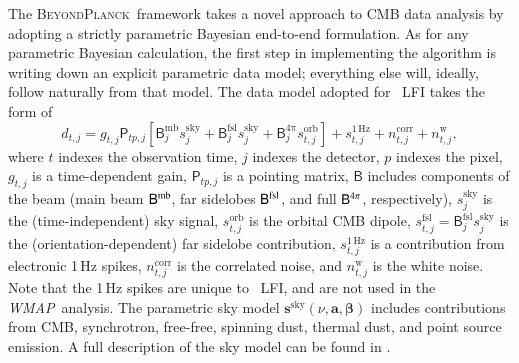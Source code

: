 \documentclass[twocolumn]{aa}
\def\wmap{\emph{WMAP}}
\newcommand{\BP}{\textsc{BeyondPlanck}}
\begin{document}
The \BP\ framework \citep{bp01} takes a novel approach to CMB data analysis by
adopting a strictly parametric Bayesian end-to-end formulation. As for any
parametric Bayesian calculation, the first step in implementing the algorithm
is writing down an explicit parametric data model; everything else will, ideally,
follow naturally from that model. The data model adopted for \Planck\
LFI takes the form of
\begin{equation} d_{t,j}=g_{t,j} \mathsf P_{tp,j}\left[
	\mathsf B_{j}^\mathrm{mb} s_{j}^\mathrm{sky} + \mathsf
	B_{j}^\mathrm{fsl} s_{j}^{\mathrm{sky}} +\mathsf
	B_{j}^\mathrm{4\pi}s_{t,j}^\mathrm{orb} \right]
	+ s_{t,j}^{\mathrm{1\,Hz}}+n_{t,j}^\mathrm{corr}+n_{t,j}^\mathrm w,
	    \label{eq:todmodel}
\end{equation}
where $t$ indexes the observation time, $j$ indexes the
detector, $p$ indexes the pixel, $g_{t,j}$ is a time-dependent gain, $\mathsf P_{tp,j}$ is a pointing
matrix, $\mathsf B$ includes components of the beam (main beam $\mathsf{B}^\mathrm{mb}$, far sidelobes $\mathsf{B}^\mathrm{fsl}$, and full $\mathsf{B}^\mathrm{4\pi}$, respectively), $s_{j}^\mathrm{sky}$ is the (time-independent)
sky signal, $s_{t,j}^\mathrm{orb}$ is the orbital CMB dipole,
${s_{t,j}^\mathrm{fsl}=\mathsf B_j^\mathrm{fsl}s_{j}^\mathrm{sky}}$ is the
(orientation-dependent) far sidelobe contribution,
$s_{t,j}^\mathrm{1\,Hz}$ is a contribution from electronic 1\,Hz spikes, $n_{t,j}^\mathrm{corr}$ is
the correlated noise, and $n_{t,j}^\mathrm w$ is the white noise. Note that the 1\,Hz spikes are unique to \Planck\ LFI, and are not used in the \wmap\ analysis.
The parametric sky model $\boldsymbol s^\mathrm{sky}(\nu,\boldsymbol a,\boldsymbol\beta)$ includes contributions from CMB, synchrotron, free-free, spinning dust, thermal dust, and point source emission. A full description of the sky model can be found in \citet{bp01}.
\end{document}
